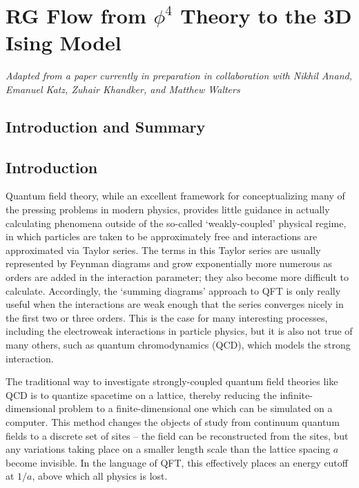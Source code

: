 \chapter{RG Flow from $\phi^4$ Theory to the 3D Ising Model}
\label{chap:3d}

\emph{Adapted from a paper currently in preparation in collaboration with 
Nikhil Anand, Emanuel Katz, Zuhair Khandker, and Matthew Walters}

\section{Introduction and Summary}

\section{Introduction}
\label{sec:Intro}

Quantum field theory, while an excellent framework for conceptualizing many of
the pressing problems in modern physics, provides little guidance in actually
calculating phenomena outside of the so-called `weakly-coupled' physical regime,
in which particles are taken to be approximately free and interactions are 
approximated via Taylor series\cite{ref:peskin}. The terms in this Taylor series
are usually represented by Feynman diagrams and grow exponentially more numerous
as orders are added in the interaction parameter; they also become more 
difficult to calculate. Accordingly, the `summing diagrams' approach to QFT is
only really useful when the interactions are weak enough that the series 
converges nicely in the first two or three orders. This is the case for many
interesting processes, including the electroweak interactions in particle 
physics, but it is also not true of many others, such as quantum chromodynamics
(QCD), which models the strong interaction.

The traditional way to investigate strongly-coupled quantum field theories like
QCD is to quantize spacetime on a lattice, thereby reducing the 
infinite-dimensional problem to a finite-dimensional one which can be simulated
on a computer\cite{ref:lattice}. This method changes the objects of study from
continuum quantum fields to a discrete set of sites -- the field can be 
reconstructed from the sites, but any variations taking place on a smaller
length scale than the lattice spacing $a$ become invisible. In the language of
QFT, this effectively places an energy cutoff at $1/a$, above which all physics
is lost.

